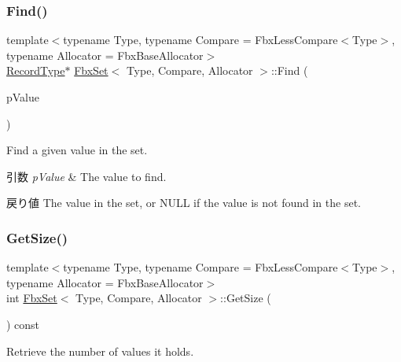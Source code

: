 \subsubsection{\texorpdfstring{Find()}{Find()}\hspace{0.1cm}{\footnotesize\ttfamily [2/2]}}
{\footnotesize\ttfamily template$<$typename Type, typename Compare = Fbx\+Less\+Compare$<$\+Type$>$, typename Allocator = Fbx\+Base\+Allocator$>$ \\
\hyperlink{class_fbx_set_aa3934cd434a09288204f5e6c99b9cd01}{Record\+Type}$\ast$ \hyperlink{class_fbx_set}{Fbx\+Set}$<$ Type, Compare, Allocator $>$\+::Find (\begin{DoxyParamCaption}\item[{const \hyperlink{class_fbx_set_abb0f1b628634e07825532526e2e92baf}{Value\+Type} \&}]{p\+Value }\end{DoxyParamCaption})}

Find a given value in the set. 
\begin{DoxyParams}{引数}
{\em p\+Value} & The value to find. \\
\hline
\end{DoxyParams}
\begin{DoxyReturn}{戻り値}
The value in the set, or N\+U\+LL if the value is not found in the set. 
\end{DoxyReturn}
\mbox{\label{class_fbx_set_a461c8f7332c997970eeb89cf7920b509}} 
\subsubsection{\texorpdfstring{Get\+Size()}{GetSize()}}
{\footnotesize\ttfamily template$<$typename Type, typename Compare = Fbx\+Less\+Compare$<$\+Type$>$, typename Allocator = Fbx\+Base\+Allocator$>$ \\
int \hyperlink{class_fbx_set}{Fbx\+Set}$<$ Type, Compare, Allocator $>$\+::Get\+Size (\begin{DoxyParamCaption}{ }\end{DoxyParamCaption}) const}



Retrieve the number of values it holds. 

\mbox{\label{class_fbx_set_a6663843db5bbd2335842fc77c02f7197}} 

